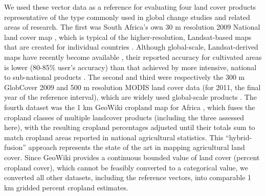 \documentclass[a4paper]{article}
\begin{document}

We used these vector data as a reference for evaluating four land cover products representative of the type commonly used in global change studies and related areas of research. The first was South Africa's own 30 m resolution 2009 National land cover map \citep[SA-LC][]{sanbi_national_2009}, which is typical of the higher-resolution, Landsat-based maps that are created for individual countries \citep[e.g.][]{fry_completion_2009}. Although global-scale, Landsat-derived maps have recently become available \citep{chen_global_2015}, their reported accuracy for cultivated areas is lower (80-85\% user's accuracy) than that achieved by more intensive, national to sub-national products \citep[e.g. 90\% user's accuracy][]{sweeney_mapping_2015}. The second and third were respectively the 300 m GlobCover 2009 \citep{arino_global_2012} and 500 m resolution MODIS land cover data (for 2011, the final year of the reference interval), which are widely used global-scale products \citep[e.g.][]{gross_monitoring_2013, shackelford_conservation_2015}. The fourth dataset was the 1 km GeoWiki cropland map for Africa \citep{fritz_mapping_2015}, which fuses the cropland classes of multiple landcover products (including the three assessed here), with the resulting cropland percentages adjusted until their totals sum to match cropland areas reported in national agricultural statistics. This ``hybrid-fusion'' approach represents the state of the art in mapping agricultural land cover. Since GeoWiki provides a continuous bounded value of land cover (percent cropland cover), which cannot be feasibly converted to a categorical value, we converted all other datasets, including the reference vectors, into comparable 1 km gridded percent cropland estimates. 

\end{document}
